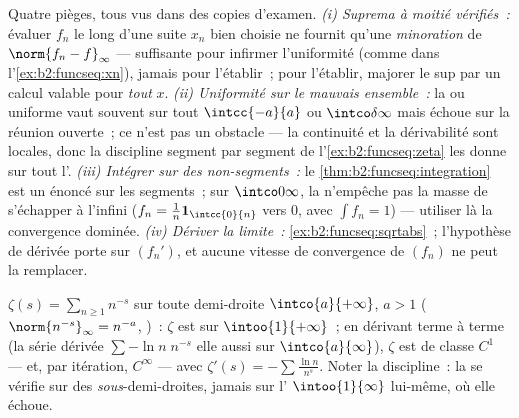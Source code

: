 \begin{remark}
Quatre pièges, tous vus dans des copies d'examen. \emph{(i)
Suprema à moitié vérifiés~:} évaluer $f_n$ le long d'une suite
$x_n$ bien choisie ne fournit qu'une \emph{minoration} de
$\norm{f_n - f}_\infty$ --- suffisante pour infirmer l'uniformité
(comme dans l'\cref{ex:b2:funcseq:xn}), jamais pour l'établir~; pour
l'établir, majorer le sup par un calcul valable pour \emph{tout} $x$.
\emph{(ii) Uniformité sur le mauvais ensemble~:} la  ou uniforme vaut souvent sur tout $\intcc{-a}{a}$ ou
$\intco\delta\infty$ mais échoue sur la réunion ouverte~; ce n'est pas
un obstacle --- la continuité et la dérivabilité sont locales, donc la
discipline segment par segment de l'\cref{ex:b2:funcseq:zeta} les
donne sur tout l'. \emph{(iii) Intégrer sur des non-segments~:}
le \cref{thm:b2:funcseq:integration} est un énoncé sur les segments~;
sur $\intco0\infty$, la  n'empêche pas la masse de
s'échapper à l'infini ($f_n =
\frac1n\mathbf 1_{\intcc{0}{n}}$   vers $0$,
avec $\int f_n = 1$) --- utiliser là la convergence dominée.
\emph{(iv) Dériver la limite~:}
\cref{ex:b2:funcseq:sqrtabs}~; l'hypothèse de dérivée porte sur
$(f_n')$, et aucune vitesse de convergence de $(f_n)$ ne peut la
remplacer.
\end{remark}

\begin{example}\label{ex:b2:funcseq:zeta}
$\zeta(s) = \sum_{n\geq1} n^{-s}$   sur toute
demi-droite $\intco{a}{+\infty}$, $a > 1$ ($\norm{n^{-s}}_\infty =
n^{-a}$, )~: $\zeta$ est  sur $\intoo{1}{+\infty}$~;
en dérivant terme à terme (la série dérivée $\sum -\ln n\; n^{-s}$
 elle aussi  sur $\intco{a}{\infty}$), $\zeta$ est
de classe $C^1$ --- et, par itération, $C^\infty$ --- avec
$\zeta'(s) = -\sum \frac{\ln n}{n^s}$. Noter la discipline~: la
 se vérifie sur des \emph{sous}-demi-droites,
jamais sur l' $\intoo{1}{\infty}$ lui-même, où elle échoue.
\end{example}

